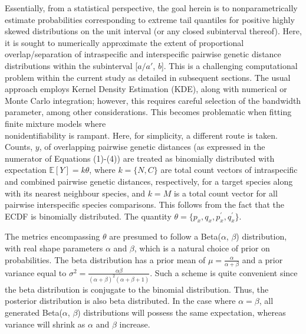\documentclass[12pt]{article}
\begin{document}
Essentially, from a statistical perspective, the goal herein is to nonparametrically estimate probabilities corresponding to extreme tail quantiles for positive highly skewed distributions on the unit interval  (or any closed subinterval thereof). Here, it is sought to numerically approximate the extent of proportional overlap/separation of intraspecific and interspecific pairwise genetic distance distributions within the subinterval [$a/a'$, $b$]. This is a challenging computational problem within the current study as detailed in subsequent sections. The usual approach employs Kernel Density Estimation (KDE), along with numerical or Monte Carlo integration; however, this requires careful selection of the bandwidth parameter, among other considerations. This becomes problematic when fitting finite mixture models where \\ nonidentifiability is rampant. Here, for simplicity, a different route is taken. Counts, $y$, of overlapping pairwise genetic distances (as expressed in the numerator of Equations (1)-(4)) are treated as binomially distributed with expectation $\mathbb{E}[Y] = k\theta$, where $k = \{N, C\}$ are total count vectors of intraspecific and combined pairwise genetic distances, respectively, for a target species along with its nearest neighbour species, and $k = M$ is a total count vector for all pairwise interspecific species comparisons. This follows from the fact that the ECDF is binomially distributed. The quantity $\theta = \{p_x, q_x, p^{'}_x, q^{'}_x\}$. 

The metrics encompassing $\theta$ are presumed to follow a Beta($\alpha$, $\beta$) distribution, with real shape parameters $\alpha$ and $\beta$, which is a natural choice of prior on probabilities. The beta distribution has a prior mean of $\mu = \frac{\alpha}{\alpha + \beta}$ and a prior variance equal to $\sigma^2 = \frac{\alpha\beta}{(\alpha + \beta)^2(\alpha + \beta + 1)}$. Such a scheme is quite convenient since the beta distribution is conjugate to the binomial distribution. Thus, the posterior distribution is also beta distributed. In the case where $\alpha = \beta$, all generated Beta($\alpha$, $\beta$) distributions will possess the same expectation, whereas variance will shrink as $\alpha$ and $\beta$ increase.
\end{document}
